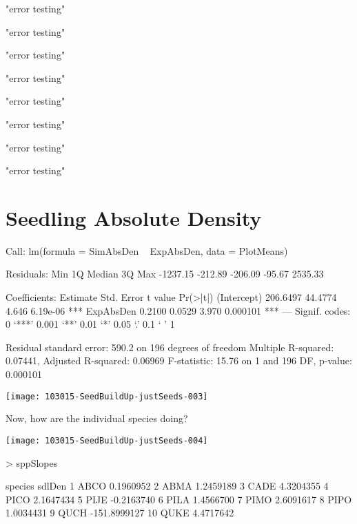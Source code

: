 \documentclass{article}
\begin{document}
\begin{Schunk}
\begin{Soutput}
\end{Soutput}
\begin{Soutput}
[1] "error testing"
\end{Soutput}
\begin{Soutput}
[1] "error testing"
\end{Soutput}
\begin{Soutput}
[1] "error testing"
\end{Soutput}
\begin{Soutput}
[1] "error testing"
\end{Soutput}
\begin{Soutput}
[1] "error testing"
\end{Soutput}
\begin{Soutput}
[1] "error testing"
\end{Soutput}
\begin{Soutput}
[1] "error testing"
\end{Soutput}
\begin{Soutput}
[1] "error testing"
\end{Soutput}
\end{Schunk}


\newpage

\section{Seedling Absolute Density}
\begin{Schunk}
\begin{Soutput}
Call:
lm(formula = SimAbsDen ~ ExpAbsDen, data = PlotMeans)

Residuals:
     Min       1Q   Median       3Q      Max 
-1237.15  -212.89  -206.09   -95.67  2535.33 

Coefficients:
            Estimate Std. Error t value Pr(>|t|)    
(Intercept) 206.6497    44.4774   4.646 6.19e-06 ***
ExpAbsDen     0.2100     0.0529   3.970 0.000101 ***
---
Signif. codes:  0 ‘***’ 0.001 ‘**’ 0.01 ‘*’ 0.05 ‘.’ 0.1 ‘ ’ 1

Residual standard error: 590.2 on 196 degrees of freedom
Multiple R-squared:  0.07441,	Adjusted R-squared:  0.06969 
F-statistic: 15.76 on 1 and 196 DF,  p-value: 0.000101
\end{Soutput}
\end{Schunk}
\texttt{[image: 103015-SeedBuildUp-justSeeds-003]}

Now, how are the individual species doing?

\texttt{[image: 103015-SeedBuildUp-justSeeds-004]}
\begin{Schunk}
\begin{Sinput}
>   sppSlopes
\end{Sinput}
\begin{Soutput}
   species       sdlDen
1     ABCO    0.1960952
2     ABMA    1.2459189
3     CADE    4.3204355
4     PICO    2.1647434
5     PIJE   -0.2163740
6     PILA    1.4566700
7     PIMO    2.6091617
8     PIPO    1.0034431
9     QUCH -151.8999127
10    QUKE    4.4717642
\end{Soutput}
\end{Schunk}
\end{document}
